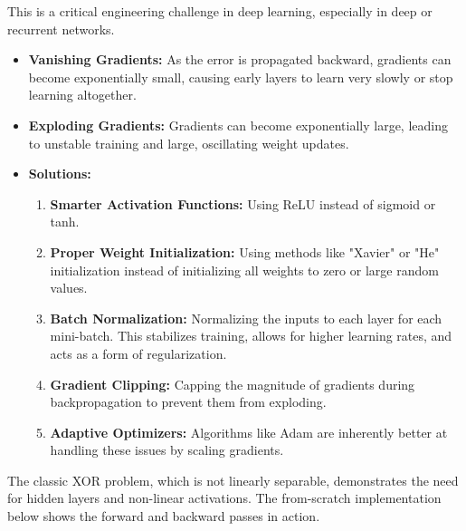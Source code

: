 \documentclass[11pt,a4paper]{article}
\begin{document}
This is a critical engineering challenge in deep learning, especially in deep or recurrent networks.
\begin{itemize}
    \item \textbf{Vanishing Gradients:} As the error is propagated backward, gradients can become exponentially small, causing early layers to learn very slowly or stop learning altogether.
    \item \textbf{Exploding Gradients:} Gradients can become exponentially large, leading to unstable training and large, oscillating weight updates.
    \item \textbf{Solutions:}
    \begin{enumerate}
        \item \textbf{Smarter Activation Functions:} Using ReLU instead of sigmoid or tanh.
        \item \textbf{Proper Weight Initialization:} Using methods like "Xavier" or "He" initialization instead of initializing all weights to zero or large random values.
        \item \textbf{Batch Normalization:} Normalizing the inputs to each layer for each mini-batch. This stabilizes training, allows for higher learning rates, and acts as a form of regularization.
        \item \textbf{Gradient Clipping:} Capping the magnitude of gradients during backpropagation to prevent them from exploding.
        \item \textbf{Adaptive Optimizers:} Algorithms like Adam are inherently better at handling these issues by scaling gradients.
    \end{enumerate}
\end{itemize}

The classic XOR problem, which is not linearly separable, demonstrates the need for hidden layers and non-linear activations. The from-scratch implementation below shows the forward and backward passes in action.
\end{document}
